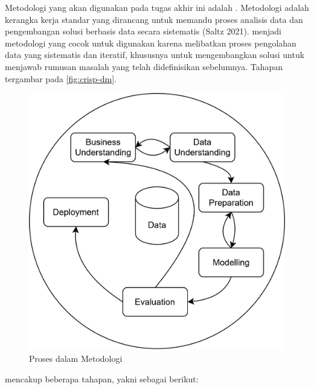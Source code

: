 Metodologi yang akan digunakan pada tugas akhir ini adalah \crispfull. Metodologi \crisp{} adalah kerangka kerja standar yang dirancang untuk memandu proses analisis data dan pengembangan solusi berbasis data secara sistematis (Saltz 2021). \crisp{} menjadi metodologi yang cocok untuk digunakan karena melibatkan proses pengolahan data yang sistematis dan iteratif, khususnya untuk mengembangkan solusi untuk menjawab rumusan masalah yang telah didefinisikan sebelumnya. Tahapan \crisp{} tergambar pada \autoref{fig:crisp-dm}.

\begin{figure}[htbp]
	\centering
	\includegraphics[width=.8\textwidth]{../images/crispdm.png}
	\caption{Proses dalam Metodologi \crisp{}}
	\label{fig:crisp-dm}
\end{figure}

\pagebreak

\crisp{} mencakup beberapa tahapan, yakni sebagai berikut:
